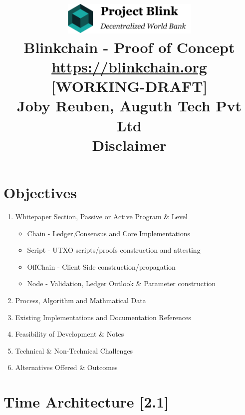 \documentclass[a4paper,11pt]{article}
\title{

\centering
\includegraphics[width=6.5cm]{logo}\\
\vspace{5mm}
Blinkchain - Proof of Concept\\
\vspace{2mm}
\footnotesize{\url{https://blinkchain.org}}\\
\vspace{3mm}
\small{[WORKING-DRAFT]}\\
\vspace{5mm}
\small{Joby Reuben, Auguth Tech Pvt Ltd}\\
\vspace{10mm}
\small{\textbf{Disclaimer}}\\
\justifying
\small{\blindtext}
}
\date{\vspace{-5ex}}
\begin{document}
\maketitle


\section{Objectives}

\begin{enumerate}
\item Whitepaper Section, Passive or Active Program \& Level
\begin{itemize}
\item Chain - Ledger,Consensus and Core Implementations
\item Script - UTXO scripts/proofs construction and attesting
\item OffChain - Client Side construction/propagation
\item Node - Validation, Ledger Outlook \& Parameter construction
\end{itemize}
\item Process, Algorithm and Mathmatical Data
\item Existing Implementations and Documentation References
\item Feasibility of Development \& Notes
\item Technical \& Non-Technical Challenges
\item Alternatives Offered \& Outcomes
\end{enumerate}


\newpage
\tableofcontents

\newpage

\section{Time Architecture [2.1]}
\end{document}
